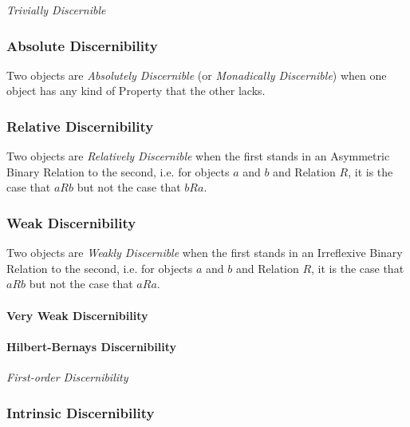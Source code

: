 \emph{Trivially Discernible}



\subsubsection{Absolute Discernibility}\label{sec:absolute_discernibility}

Two objects are \emph{Absolutely Discernible} (or \emph{Monadically
  Discernible}) when one object has any kind of Property that the
other lacks.



\subsubsection{Relative Discernibility}\label{sec:relative_discernibility}

Two objects are \emph{Relatively Discernible} when the first stands in
an Asymmetric Binary Relation to the second, i.e. for objects $a$ and
$b$ and Relation $R$, it is the case that $aRb$ but not the case that
$bRa$.



\subsubsection{Weak Discernibility}\label{sec:weak_discernibility}

Two objects are \emph{Weakly Discernible} when the first stands in an
Irreflexive Binary Relation to the second, i.e. for objects $a$ and
$b$ and Relation $R$, it is the case that $aRb$ but not the case that
$aRa$.

\paragraph{Very Weak Discernibility}\label{sec:very_weak_discernibility}\hfill

\paragraph{Hilbert-Bernays Discernibility}\hfill
\label{sec:hilbert_bernays_discernibility}

\emph{First-order Discernibility}


\subsubsection{Intrinsic Discernibility}\label{sec:intrinsic_discernibility}

